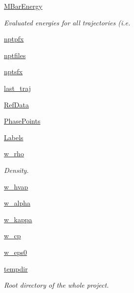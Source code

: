 \begin{DoxyCompactItemize}
\hyperlink{classforcebalance_1_1liquid_1_1Liquid_a6c00a87ae43f535118b77d41af51a5d7}{M\-Bar\-Energy}
\begin{DoxyCompactList}\small\item\em Evaluated energies for all trajectories (i.\-e. \end{DoxyCompactList}\item 
\hyperlink{classforcebalance_1_1liquid_1_1Liquid_a0560795c55fc1b5d7668951c77ad97ab}{nptpfx}
\item 
\hyperlink{classforcebalance_1_1liquid_1_1Liquid_a2030a7e21fcce59155a0258daed4f2f7}{nptfiles}
\item 
\hyperlink{classforcebalance_1_1liquid_1_1Liquid_a4125a209929444b7cbfbd60b466dc763}{nptsfx}
\item 
\hyperlink{classforcebalance_1_1liquid_1_1Liquid_a95bb7b38b7638acba286718e55f783bb}{last\-\_\-traj}
\item 
\hyperlink{classforcebalance_1_1liquid_1_1Liquid_a472f32bbaf18b8ead19b9156f305b8fc}{Ref\-Data}
\item 
\hyperlink{classforcebalance_1_1liquid_1_1Liquid_a2c10490d9073a069bd19361f386422ef}{Phase\-Points}
\item 
\hyperlink{classforcebalance_1_1liquid_1_1Liquid_a50f976d2d3d6a1c261756035a26390e2}{Labels}
\item 
\hyperlink{classforcebalance_1_1liquid_1_1Liquid_aef8ad1dda086bde6f48130d273af9784}{w\-\_\-rho}
\begin{DoxyCompactList}\small\item\em Density. \end{DoxyCompactList}\item 
\hyperlink{classforcebalance_1_1liquid_1_1Liquid_abe985fe3aaa03d9f3a1b0a90f26b774d}{w\-\_\-hvap}
\item 
\hyperlink{classforcebalance_1_1liquid_1_1Liquid_a0d36d27d8c406b53bbb1096fbb76adbb}{w\-\_\-alpha}
\item 
\hyperlink{classforcebalance_1_1liquid_1_1Liquid_a6b262d9343247a902063bf62d5f19108}{w\-\_\-kappa}
\item 
\hyperlink{classforcebalance_1_1liquid_1_1Liquid_a3809c649d95ac6c9f662d599e6b1b93d}{w\-\_\-cp}
\item 
\hyperlink{classforcebalance_1_1liquid_1_1Liquid_a75ad3ea94ec845e91499f858e7be5f27}{w\-\_\-eps0}
\item 
\hyperlink{classforcebalance_1_1target_1_1Target_aa1f01b5b78db253b5b66384ed11ed193}{tempdir}
\begin{DoxyCompactList}\small\item\em Root directory of the whole project. \end{DoxyCompactList}\item 

\end{DoxyCompactItemize}
